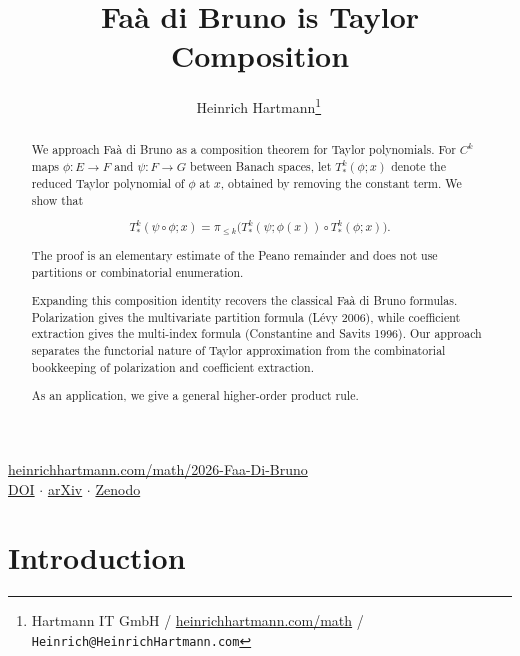 \documentclass[10pt,a4paper]{article}
\title{Faà di Bruno is Taylor Composition}
\author{Heinrich Hartmann\footnote{Hartmann IT GmbH / \href{https://heinrichhartmann.com/math}{heinrichhartmann.com/math} / \texttt{Heinrich@HeinrichHartmann.com}}\;\,\orcidlink{0000-0002-3929-2421}}
\date{}
\theoremstyle{plain}
\theoremstyle{definition}
\newcommand{\1}{\mathbb{1}} %
\begin{document}
\maketitle
\vspace{-3em}\begin{center}\href{https://heinrichhartmann.com/math/2026-Faa-Di-Bruno}{heinrichhartmann.com/math/2026-Faa-Di-Bruno}\\[0.3em]\href{https://doi.org/10.48550/arXiv.2606.26133}{DOI} $\cdot$ \href{https://arxiv.org/abs/2606.26133}{arXiv} $\cdot$ \href{https://doi.org/10.5281/zenodo.18203201}{Zenodo}\end{center}\vspace{0.5em}

\begin{abstract}
We approach Faà di Bruno as a composition theorem for Taylor polynomials.
For $C^k$ maps $\phi: E \to F$ and $\psi: F \to G$ between Banach spaces,
let $T^k_\ast(\phi; x)$ denote the reduced Taylor polynomial of $\phi$ at $x$, obtained by removing the constant term.
We show that

$$T^k_\ast(\psi \circ \phi; x) = \pi_{\le k}\bigl(T^k_\ast(\psi; \phi(x)) \circ T^k_\ast(\phi; x)\bigr).$$

The proof is an elementary estimate of the Peano remainder and does not use partitions or combinatorial enumeration.

Expanding this composition identity recovers the classical Faà di Bruno formulas.
Polarization gives the multivariate partition formula (Lévy 2006), while coefficient extraction gives the multi-index formula (Constantine and Savits 1996).
Our approach separates the functorial nature of Taylor approximation from the combinatorial bookkeeping of polarization and coefficient extraction.

As an application, we give a general higher-order product rule.
\end{abstract}

\tableofcontents

\section{Introduction}\label{introduction}
\end{document}
